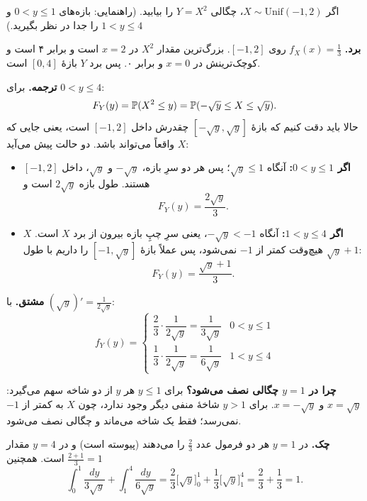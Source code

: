\begin{exercise}\hard
اگر $X\sim\mathrm{Unif}(-1,2)$، چگالی $Y=X^2$ را بیابید. (راهنمایی: بازه‌های $0<y\le1$ و $1<y\le4$ را جدا در نظر بگیرید.)
\begin{solution}
\textbf{برد.} $f_X(x)=\frac13$ روی $[-1,2]$. بزرگ‌ترین مقدار $X^2$ در $x=2$ است و برابر ۴ است و کوچک‌ترینش در $x=0$ و برابر ۰. پس برد $Y$ بازهٔ $[0,4]$ است.

\textbf{ترجمه.} برای $0<y\le4$:
\[ F_Y(y)=\P(X^2\le y)=\P(-\sqrt y\le X\le\sqrt y). \]
حالا باید دقت کنیم که بازهٔ $[-\sqrt y,\sqrt y]$ چقدرش داخل $[-1,2]$ است، یعنی جایی که $X$ واقعاً می‌تواند باشد. دو حالت پیش می‌آید:
\begin{itemize}
  \item \textbf{اگر $0<y\le1$:} آنگاه $\sqrt y\le1$؛ پس هر دو سرِ بازه، $-\sqrt y$ و $\sqrt y$، داخل $[-1,2]$ هستند. طول بازه $2\sqrt y$ است و
  \[ F_Y(y)=\frac{2\sqrt y}{3}. \]
  \item \textbf{اگر $1<y\le4$:} آنگاه $-\sqrt y<-1$، یعنی سرِ چپِ بازه بیرون از برد $X$ است. $X$ هیچ‌وقت کمتر از $-1$ نمی‌شود، پس عملاً بازهٔ $[-1,\sqrt y]$ را داریم با طول $\sqrt y+1$:
  \[ F_Y(y)=\frac{\sqrt y+1}{3}. \]
\end{itemize}

\textbf{مشتق.} با $(\sqrt y)'=\frac{1}{2\sqrt y}$:
\[ f_Y(y)=\begin{cases}\dfrac{2}{3}\cdot\dfrac{1}{2\sqrt y}=\dfrac{1}{3\sqrt y} & 0<y\le1\\[10pt] \dfrac13\cdot\dfrac{1}{2\sqrt y}=\dfrac{1}{6\sqrt y} & 1<y\le4\end{cases} \]

\textbf{چرا در $y=1$ چگالی نصف می‌شود؟} برای $y\le1$ هر $y$ از دو شاخه سهم می‌گیرد: $x=\sqrt y$ و $x=-\sqrt y$. برای $y>1$ شاخهٔ منفی دیگر وجود ندارد، چون $X$ به کمتر از $-1$ نمی‌رسد؛ فقط یک شاخه می‌ماند و چگالی نصف می‌شود.

\textbf{چک.} در $y=1$ هر دو فرمول  عدد $\frac23$ را می‌دهند (پیوسته است) و در $y=4$ مقدار $\frac{2+1}{3}=1$ است. همچنین
\[ \int_0^1\frac{dy}{3\sqrt y}+\int_1^4\frac{dy}{6\sqrt y}=\frac23\bigl[\sqrt y\bigr]_0^1+\frac13\bigl[\sqrt y\bigr]_1^4=\frac23+\frac13=1. \]
\end{solution}
\end{exercise}

